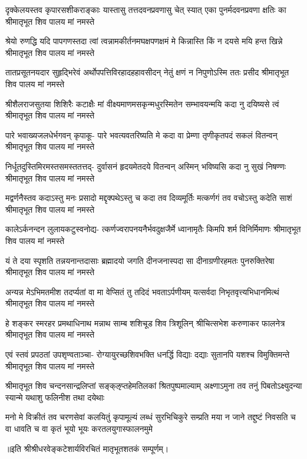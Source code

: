 \fourlineindentedshloka
{दृक्केलयस्तव कृपारसशीकराङ्काः}
{यास्तासु तत्तदवनप्रवणासु चेत् स्यात्}
{एका पुनर्मदवनप्रवणा क्षतिः का}
{श्रीमातृभूत शिव पालय मां नमस्ते} %

\fourlineindentedshloka
{श्रेयो रुणद्धि यदि पापगणस्तदा त्वां}
{त्वन्नामकीर्तनमघक्षपणक्षमं मे}
{किन्नास्ति किं न दयसे मयि हन्त खिन्ने}
{श्रीमातृभूत शिव पालय मां नमस्ते} %

\fourlineindentedshloka
{तातप्रसूतनयदार सुहृद्भिरेवं}
{अर्थोपपत्तिविरहादहहावसीदन्}
{नेतुं क्षणं न निपुणोऽस्मि ततः प्रसीद}
{श्रीमातृभूत शिव पालय मां नमस्ते} %

\fourlineindentedshloka
{श्रीशैलराजसुतया शिशिरैः कटाक्षैः}
{मां वीक्ष्यमाणमसकृन्मधुरस्मितेन}
{सम्भावयन्मयि कदा नु दयिष्यसे त्वं}
{श्रीमातृभूत शिव पालय मां नमस्ते} %

\fourlineindentedshloka
{पारे भवाख्यजलधेर्भगवन् कृपाकू-}
{पारे भवत्यवतरिष्यति मे कदा वा}
{प्रेम्णा तृणीकृतपदं सकलं वितन्वन्}
{श्रीमातृभूत शिव पालय मां नमस्ते} %

\fourlineindentedshloka
{निर्धूतदुस्तिमिरमस्तसमस्ततत्तद्-}
{दुर्वासनं हृदयमेतदये वितन्वन्}
{अस्मिन् भविष्यसि कदा नु सुखं निषण्णः}
{श्रीमातृभूत शिव पालय मां नमस्ते} %

\fourlineindentedshloka
{मद्वर्णनैस्तव कदाऽस्तु मनः प्रसादो}
{मद्दृक्पथेऽस्तु च कदा तव दिव्यमूर्तिः}
{मत्कर्णगं तव वचोऽस्तु कदेति साशं}
{श्रीमातृभूत शिव पालय मां नमस्ते} %

\fourlineindentedshloka
{कालेऽर्कनन्दन लुलायकटुस्वनोद्य-}
{त्कर्णज्वरापनयनैर्भवदुक्षजैर्मे}
{ध्वानामृतैः किमपि शर्म विनिर्मिमाणः}
{श्रीमातृभूत शिव पालय मां नमस्ते} %

\fourlineindentedshloka
{यं ते दया स्पृशति तन्नयनान्तदासाः}
{ब्रह्मादयो जगति दीनजनास्पदा सा}
{दीनाग्रणीरहमतः पुनरुक्तिरेषा}
{श्रीमातृभूत शिव पालय मां नमस्ते} %

\fourlineindentedshloka
{अन्यन्न मेऽभिमतमीश तदर्प्यतां वा}
{मा वेप्सितं तु तदिदं भवताऽर्पणीयम्}
{यत्सर्वदा निभृतवृत्त्यभिधानमित्थं}
{श्रीमातृभूत शिव पालय मां नमस्ते} %

\fourlineindentedshloka
{हे शङ्कर स्मरहर प्रमथाधिनाथ}
{मन्नाथ साम्ब शशिचूड शिव त्रिशूलिन्}
{श्रीचित्सभेश करुणाकर फालनेत्र}
{श्रीमातृभूत शिव पालय मां नमस्ते} %

\fourlineindentedshloka
{एवं स्तवं प्रपठतां उपश‍ृण्वताञ्चा-}
{रोग्यायुरच्छशिवभक्ति धनर्द्धि विद्याः}
{दद्याः सुतानपि यशश्च विमुक्तिमन्ते}
{श्रीमातृभूत शिव पालय मां नमस्ते} %

\fourlineindentedshloka
{श्रीमातृभूत शिव चन्दनसान्द्रलिप्तां}
{सङ्क्ऌप्तहेमतिलकां श्रितपुष्पमाल्याम्}
{अक्ष्णाऽमुना तव तनुं पिबतोऽक्ष्युदन्या}
{स्यान्मे यथाशु फलिनीश तथा दयेथाः} %

\fourlineindentedshloka
{मनो मे विक्रीतं तव चरणसेवां कलयितुं}
{कृपामूल्यं लब्धं सुरभिचिकुरे सम्प्रति मया}
{न जाने तद्दुष्टं निवसति च वा धावति च वा}
{कृतं भूयो भूयः करतलयुगास्फालनमुमे} %

॥इति श्रीश्रीधरवेङ्कटेशार्यविरचितं मातृभूतशतकं सम्पूर्णम्।